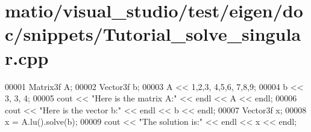 \hypertarget{matio_2visual__studio_2test_2eigen_2doc_2snippets_2_tutorial__solve__singular_8cpp_source}{}\section{matio/visual\+\_\+studio/test/eigen/doc/snippets/\+Tutorial\+\_\+solve\+\_\+singular.cpp}
\label{matio_2visual__studio_2test_2eigen_2doc_2snippets_2_tutorial__solve__singular_8cpp_source}

\begin{DoxyCode}
00001 Matrix3f A;
00002 Vector3f b;
00003 A << 1,2,3,  4,5,6,  7,8,9;
00004 b << 3, 3, 4;
00005 cout << \textcolor{stringliteral}{"Here is the matrix A:"} << endl << A << endl;
00006 cout << \textcolor{stringliteral}{"Here is the vector b:"} << endl << b << endl;
00007 Vector3f x;
00008 x = A.lu().solve(b);
00009 cout << \textcolor{stringliteral}{"The solution is:"} << endl << x << endl;
\end{DoxyCode}
